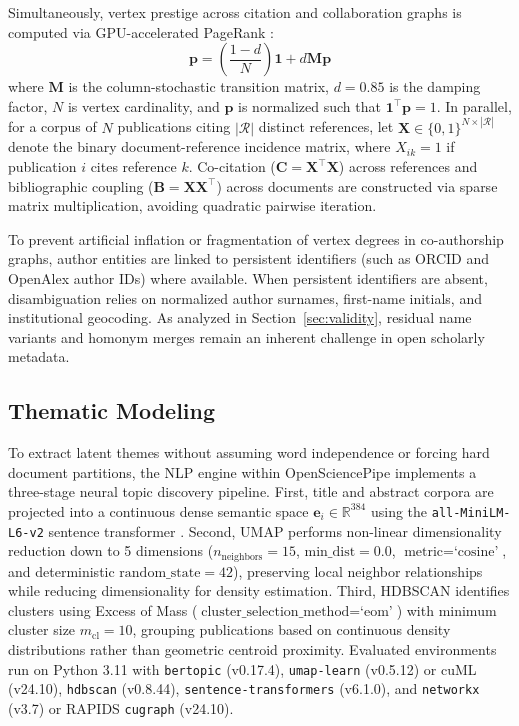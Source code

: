 \documentclass[preprint,12pt]{elsarticle}
\begin{document}
Simultaneously, vertex prestige across citation and collaboration graphs is computed via GPU-accelerated PageRank \cite{page1999pagerank}:
\begin{equation}
\mathbf{p} = \left(\frac{1-d}{N}\right) \mathbf{1} + d \mathbf{M} \mathbf{p}
\end{equation}
where $\mathbf{M}$ is the column-stochastic transition matrix, $d = 0.85$ is the damping factor, $N$ is vertex cardinality, and $\mathbf{p}$ is normalized such that $\mathbf{1}^\top \mathbf{p} = 1$. In parallel, for a corpus of $N$ publications citing $|\mathcal{R}|$ distinct references, let $\mathbf{X} \in \{0, 1\}^{N \times |\mathcal{R}|}$ denote the binary document-reference incidence matrix, where $X_{ik} = 1$ if publication $i$ cites reference $k$. Co-citation ($\mathbf{C} = \mathbf{X}^\top \mathbf{X}$) across references and bibliographic coupling ($\mathbf{B} = \mathbf{X}\mathbf{X}^\top$) across documents are constructed via sparse matrix multiplication, avoiding quadratic pairwise iteration.

To prevent artificial inflation or fragmentation of vertex degrees in co-authorship graphs, author entities are linked to persistent identifiers (such as ORCID and OpenAlex author IDs) where available. When persistent identifiers are absent, disambiguation relies on normalized author surnames, first-name initials, and institutional geocoding. As analyzed in Section~\ref{sec:validity}, residual name variants and homonym merges remain an inherent challenge in open scholarly metadata.

\subsection{Thematic Modeling}
To extract latent themes without assuming word independence or forcing hard document partitions, the NLP engine within OpenSciencePipe implements a three-stage neural topic discovery pipeline. First, title and abstract corpora are projected into a continuous dense semantic space $\mathbf{e}_i \in \mathbb{R}^{384}$ using the \texttt{all-MiniLM-L6-v2} sentence transformer \cite{reimers2019sentence}. Second, UMAP \cite{mcinnes2018umap} performs non-linear dimensionality reduction down to 5 dimensions ($n_{\text{neighbors}} = 15$, $\text{min\_dist} = 0.0$, $\text{metric} = \text{`cosine'}$, and deterministic $\text{random\_state} = 42$), preserving local neighbor relationships while reducing dimensionality for density estimation. Third, HDBSCAN \cite{campello2013density} identifies clusters using Excess of Mass ($\text{cluster\_selection\_method} = \text{`eom'}$) with minimum cluster size $m_{\text{cl}} = 10$, grouping publications based on continuous density distributions rather than geometric centroid proximity. Evaluated environments run on Python 3.11 with \texttt{bertopic} (v0.17.4), \texttt{umap-learn} (v0.5.12) or cuML (v24.10), \texttt{hdbscan} (v0.8.44), \texttt{sentence-transformers} (v6.1.0), and \texttt{networkx} (v3.7) or RAPIDS \texttt{cugraph} (v24.10).
\end{document}
